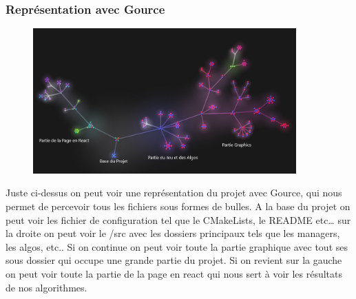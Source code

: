 \subsubsection{Représentation avec Gource}
\begin{figure}
	\centering
	
		\includegraphics[width=0.9\textwidth]{images/GourceScreen.png}
	
	\label{fig:game}
\end{figure}
Juste ci-dessus on peut voir une représentation du projet avec Gource, qui nous permet de percevoir tous les fichiers sous formes de bulles. A la base du projet on peut voir les fichier de configuration tel que le CMakeLists, le README etc… sur la droite on peut voir le /src avec les dossiers principaux tels que les managers, les algos, etc.. Si on continue on peut voir toute la partie graphique avec tout ses sous dossier qui occupe une grande partie du projet. Si on revient sur la gauche on peut voir toute la partie de la page en react qui nous sert à voir les résultats de nos algorithmes.

